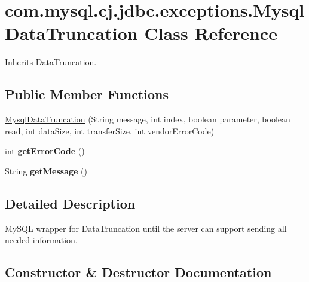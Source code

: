 \hypertarget{classcom_1_1mysql_1_1cj_1_1jdbc_1_1exceptions_1_1_mysql_data_truncation}{}\section{com.\+mysql.\+cj.\+jdbc.\+exceptions.\+Mysql\+Data\+Truncation Class Reference}
\label{classcom_1_1mysql_1_1cj_1_1jdbc_1_1exceptions_1_1_mysql_data_truncation}


Inherits Data\+Truncation.

\subsection*{Public Member Functions}
\begin{DoxyCompactItemize}
\item 
\mbox{\hyperlink{classcom_1_1mysql_1_1cj_1_1jdbc_1_1exceptions_1_1_mysql_data_truncation_afc998a9007a27ce2636aae9668d573c4}{Mysql\+Data\+Truncation}} (String message, int index, boolean parameter, boolean read, int data\+Size, int transfer\+Size, int vendor\+Error\+Code)
\item 
\mbox{\label{classcom_1_1mysql_1_1cj_1_1jdbc_1_1exceptions_1_1_mysql_data_truncation_a373827e2e03f041bfd9ee0d882b07b60}} 
int {\bfseries get\+Error\+Code} ()
\item 
\mbox{\label{classcom_1_1mysql_1_1cj_1_1jdbc_1_1exceptions_1_1_mysql_data_truncation_a9879279a524e5c4f03fba46107925891}} 
String {\bfseries get\+Message} ()
\end{DoxyCompactItemize}


\subsection{Detailed Description}
My\+S\+QL wrapper for Data\+Truncation until the server can support sending all needed information. 

\subsection{Constructor \& Destructor Documentation}
\mbox{\label{classcom_1_1mysql_1_1cj_1_1jdbc_1_1exceptions_1_1_mysql_data_truncation_afc998a9007a27ce2636aae9668d573c4}} 
